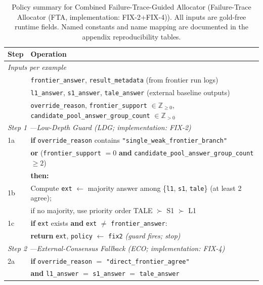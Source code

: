 \begin{table}[t]
\centering
\caption{Policy summary for Combined Failure-Trace-Guided Allocator (Failure-Trace Allocator (FTA, implementation: FIX-2+FIX-4)). All inputs are gold-free runtime fields. Named constants and name mapping are documented in the appendix reproducibility tables.}
\label{alg:fix24}
\scriptsize
\begin{tabular}{p{} p{}}
\toprule
\textbf{Step} & \textbf{Operation} \\
\midrule
\multicolumn{2}{l}{\textit{Inputs per example}} \\
& \texttt{frontier\_answer}, \texttt{result\_metadata} (from frontier run logs) \\
& \texttt{l1\_answer}, \texttt{s1\_answer}, \texttt{tale\_answer} (external baseline outputs) \\
& \texttt{override\_reason}, \texttt{frontier\_support} $\in \mathbb{Z}_{\geq 0}$, \texttt{candidate\_pool\_answer\_group\_count} $\in \mathbb{Z}_{>0}$ \\
\midrule
\multicolumn{2}{l}{\textit{Step 1 ---Low-Depth Guard (LDG; implementation: FIX-2)}} \\
1a & \textbf{if} \texttt{override\_reason} contains \texttt{"single\_weak\_frontier\_branch"} \\
   & \quad \textbf{or} (\texttt{frontier\_support} $= 0$ \textbf{and} \texttt{candidate\_pool\_answer\_group\_count} $\geq 2$) \\
   & \textbf{then:} \\
1b & \quad Compute \texttt{ext} $\leftarrow$ majority answer among \{\texttt{l1}, \texttt{s1}, \texttt{tale}\} (at least 2 agree); \\
   & \quad if no majority, use priority order TALE $\succ$ S1 $\succ$ L1 \\
1c & \quad \textbf{if} \texttt{ext} exists \textbf{and} \texttt{ext} $\neq$ \texttt{frontier\_answer}: \\
   & \quad\quad \textbf{return} \texttt{ext}, \texttt{policy} $\leftarrow$ \texttt{fix2} \quad\quad \textit{(guard fires; stop)} \\
\midrule
\multicolumn{2}{l}{\textit{Step 2 ---External-Consensus Fallback (ECO; implementation: FIX-4)}} \\
2a & \textbf{if} \texttt{override\_reason} $=$ \texttt{"direct\_frontier\_agree"} \\
   & \quad \textbf{and} \texttt{l1\_answer} $=$ \texttt{s1\_answer} $=$ \texttt{tale\_answer} \\

\end{tabular}
\end{table}

